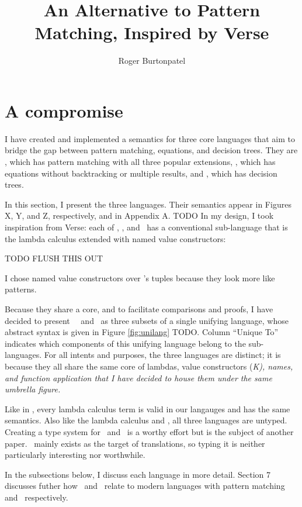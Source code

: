 \documentclass[manuscript,screen,review, 12pt, nonacm]{acmart}
\title{An Alternative to Pattern Matching, Inspired by Verse}
\author{Roger Burtonpatel}
\affiliation{%
\institution{Tufts University}
\streetaddress{419 Boston Ave}
  \city{Medford}
  \state{Massachusetts}
  \country{USA}
  \postcode{02155}
  }
\begin{document}
  
\section{A compromise}
    I have created and implemented a semantics for three core languages that aim
    to bridge the gap between pattern matching, equations, and decision trees.
    They are \PPlus, which has pattern matching with all three popular
    extensions, \VMinus, which has equations without backtracking or multiple
    results, and \D, which has decision trees. 

    In this section, I present the three languages. Their semantics appear in
    Figures X, Y, and Z, respectively, and in Appendix A. TODO In my design, I
    took inspiration from Verse: each of \PPlus, \VMinus, and \D\ has a
    conventional sub-language that is the lambda calculus extended with named
    value constructors:
    
    
    TODO FLUSH THIS OUT

    I chose named value constructors over \VC's tuples
    because they look more like patterns. 

    
    Because they share a core, and to facilitate comparisons and proofs, I have
    decided to present \VMinus\, \PPlus\, and \D\ as three subsets of a single
    unifying language, whose abstract syntax is given in Figure
    \ref{fig:unilang} TODO. Column “Unique To” indicates which components of
    this unifying language belong to the sub-languages. For all intents and
    purposes, the three languages are distinct; it is because they all share the
    same core of lambdas, value constructors (\it{K}), names, and function
    application that I have decided to house them under the same umbrella
    figure. 
    
    Like in \VC, every lambda calculus term is valid in our langauges and has
    the same semantics. Also like the lambda calculus and \VC, all three
    languages are untyped. Creating a type system for \PPlus\ and \VMinus\ is a
    worthy effort but is the subject of another paper. \D\ mainly exists as the
    target of translations, so typing it is neither particularly interesting nor
    worthwhile. 
    
    In the subsections below, I discuss each language in more detail. Section 7
    discusses futher how \PPlus\ and \VMinus\ relate to modern languages with
    pattern matching and \VC\ respectively. 
\end{document}
